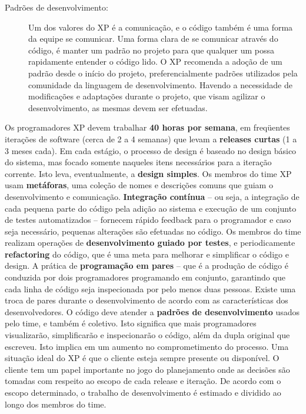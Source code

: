 \begin{description}
  \item [Padrões de desenvolvimento:] Um dos valores do XP é a comunicação, e o código também é uma forma da equipe se comunicar. Uma forma clara de se comunicar através do código, é manter um padrão no projeto para que qualquer um possa rapidamente entender o código lido. O XP recomenda a adoção de um padrão desde o início do projeto, preferencialmente padrões utilizados pela comunidade da linguagem de desenvolvimento. Havendo a necessidade de modificações e adaptações durante o projeto, que visam agilizar o desenvolvimento, as mesmas devem ser efetuadas.

\end{description}

Os programadores XP devem trabalhar \textbf{40 horas por semana}, em freqüentes iterações de software (cerca de 2 a 4 semanas) que levam a \textbf{releases curtas} (1 a 3 meses cada). Em cada estágio, o processo de design é baseado no design básico do sistema, mas focado somente naqueles itens necessários para a iteração corrente. Isto leva, eventualmente, a \textbf{design simples}. Os membros do time XP usam \textbf{metáforas}, uma coleção de nomes e descrições comuns que guiam o desenvolvimento e comunicação. \textbf{Integração contínua} – ou seja, a integração de cada pequena parte do código pela adição ao sistema e execução de um conjunto de testes automatizados – fornecem rápido feedback para o programador e caso seja necessário, pequenas alterações são efetuadas no código. Os membros do time realizam operações de \textbf{desenvolvimento guiado por testes}, e periodicamente \textbf{refactoring} do código, que é uma meta para melhorar e simplificar o código e design. A prática de \textbf{programação em pares} – que é a produção de código é conduzida por dois programadores programando em conjunto, garantindo que cada linha de código seja inspecionada por pelo menos duas pessoas. Existe uma troca de pares durante o desenvolvimento de acordo com as características dos desenvolvedores. O código deve atender a \textbf{padrões de desenvolvimento} usados pelo time, e também é coletivo. Isto significa que mais programadores visualizarão, simplificarão e inspecionarão o código, além da dupla original que escreveu. Isto implica em um aumento no comprometimento do processo. Uma situação ideal do XP é que o cliente esteja sempre presente ou disponível. O cliente tem um papel importante no jogo do planejamento onde as decisões são tomadas com respeito ao escopo de cada release e iteração. De acordo com o escopo determinado, o trabalho de desenvolvimento é estimado e dividido ao longo dos membros do time.

